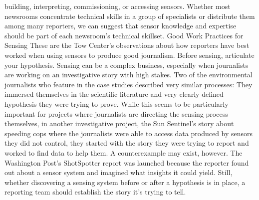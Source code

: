 building, interpreting, commissioning, or accessing sensors. Whether most
newsrooms concentrate technical skills in a group of specialists or distribute
them among many reporters, we can suggest that sensor knowledge and
expertise should be part of each newsroom's technical skillset.
Good Work Practices for Sensing
These are the Tow Center's observations about how reporters have best
worked when using sensors to produce good journalism.
Before sensing, articulate your hypothesis.
Sensing can be a complex business, especially when journalists are working
on an investigative story with high stakes. Two of the environmental journalists
who feature in the case studies described very similar processes: They
immersed themselves in the scientific literature and very clearly defined
hypothesis they were trying to prove. While this seems to be particularly
important for projects where journalists are directing the sensing process
themselves, in another investigative project, the Sun Sentinel's story about
speeding cops where the journalists were able to access data produced by
sensors they did not control, they started with the story they were trying to
report and worked to find data to help them.
A counterexample may exist, however. The Washington Post's ShotSpotter
report was launched because the reporter found out about a sensor system
and imagined what insights it could yield. Still, whether discovering a sensing
system before or after a hypothesis is in place, a reporting team should
establish the story it's trying to tell.

